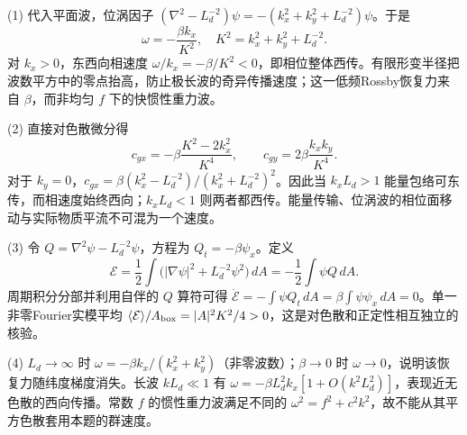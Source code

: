 (1) 代入平面波，位涡因子 \((\nabla^2-L_d^{-2})\psi=-(k_x^2+k_y^2+L_d^{-2})\psi\)。于是
\[
\boxed{\omega=-\frac{\beta k_x}{K^2}},\quad K^2=k_x^2+k_y^2+L_d^{-2}.
\]
对 \(k_x>0\)，东西向相速度 \(\omega/k_x=-\beta/K^2<0\)，即相位整体西传。有限形变半径把波数平方中的零点抬高，防止极长波的奇异传播速度；这一低频Rossby恢复力来自 \(\beta\)，而非均匀 \(f\) 下的快惯性重力波。

(2) 直接对色散微分得
\[
c_{gx}=-\beta\frac{K^2-2k_x^2}{K^4},\qquad
c_{gy}=2\beta\frac{k_xk_y}{K^4}.
\]
对于 \(k_y=0\)，\(c_{gx}=\beta(k_x^2-L_d^{-2})/(k_x^2+L_d^{-2})^2\)。因此当 \(k_xL_d>1\) 能量包络可东传，而相速度始终西向；\(k_xL_d<1\) 则两者都西传。能量传输、位涡波的相位面移动与实际物质平流不可混为一个速度。

(3) 令 \(Q=\nabla^2\psi-L_d^{-2}\psi\)，方程为 \(Q_t=-\beta\psi_x\)。定义
\[
\mathcal E=\frac12\int\bigl(|\nabla\psi|^2+L_d^{-2}\psi^2\bigr)\,dA=-\frac12\int\psi Q\,dA .
\]
周期积分分部并利用自伴的 \(Q\) 算符可得
\(\dot{\mathcal E}=-\int\psi Q_t\,dA=\beta\int\psi\psi_x\,dA=0\)。单一非零Fourier实模平均 \(\langle\mathcal E\rangle/A_{\rm box}=|A|^2K^2/4>0\)，这是对色散和正定性相互独立的核验。

(4) \(L_d\to\infty\) 时 \(\omega=-\beta k_x/(k_x^2+k_y^2)\)（非零波数）；\(\beta\to0\) 时 \(\omega\to0\)，说明该恢复力随纬度梯度消失。长波 \(kL_d\ll1\) 有 \(\omega=-\beta L_d^2k_x[1+O(k^2L_d^2)]\)，表现近无色散的西向传播。常数 \(f\) 的惯性重力波满足不同的 \(\omega^2=f^2+c^2k^2\)，故不能从其平方色散套用本题的群速度。
